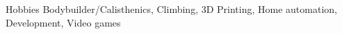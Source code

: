 

\begin{cvskills}

  \cvskill
    {Hobbies} %
    {Bodybuilder/Calisthenics, Climbing, 3D Printing, Home automation, Development, Video games} %

\end{cvskills}
